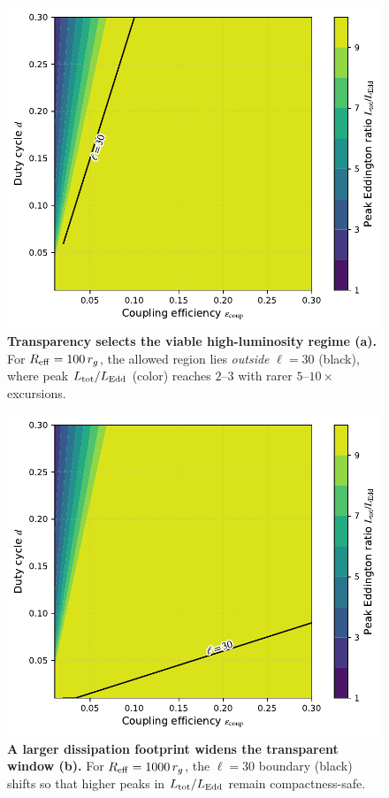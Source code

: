 \documentclass[twocolumn]{aastex701}
\begin{document}
\begin{figure}[tp!]
  \centering
  \includegraphics[width=0.95\columnwidth,trim=0 6 0 4,clip]{fig10a_Reff100.pdf}
  \vspace{-2pt}
  \caption{\textbf{Transparency selects the viable high-luminosity regime (a).}
  For $R_{\rm eff}=100\,r_g$, the allowed region lies \emph{outside} $\ell{=}30$ (black), where peak $L_{\rm tot}/L_{\rm Edd}$ (color) reaches $2$--$3$ with rarer $5$--$10\times$ excursions.}
  \label{fig:param-a}
\end{figure}
\begin{figure}[tp!]
  \centering
  \includegraphics[width=0.95\columnwidth,trim=0 6 0 4,clip]{fig10b_Reff1000.pdf}
  \vspace{-2pt}
  \caption{\textbf{A larger dissipation footprint widens the transparent window (b).}
  For $R_{\rm eff}=1000\,r_g$, the $\ell{=}30$ boundary (black) shifts so that higher peaks in $L_{\rm tot}/L_{\rm Edd}$ remain compactness-safe.}
  \label{fig:param-b}
\end{figure}
\end{document}
